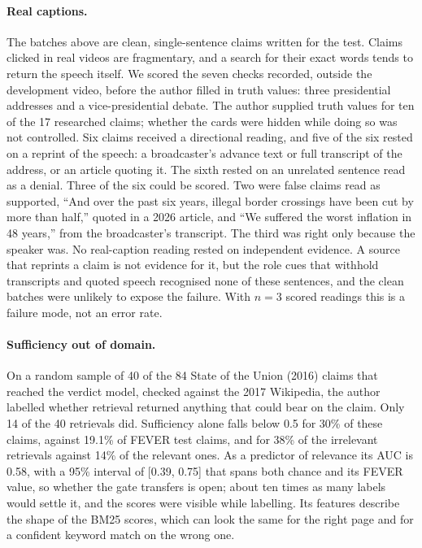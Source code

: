 \documentclass[11pt]{article}
\begin{document}
\paragraph{Real captions.} The batches above are clean, single-sentence claims written for the test.
Claims clicked in real videos are fragmentary, and a search for their exact words tends to return the
speech itself. We scored the seven checks recorded, outside the development video, before the author
filled in truth values: three presidential addresses and a vice-presidential debate. The author supplied
truth values for ten of the 17 researched claims; whether the cards were hidden while doing so was not
controlled. Six claims received a directional reading, and five of the six rested on a reprint of the
speech: a broadcaster's advance text or full transcript of the address, or an article quoting it. The
sixth rested on an unrelated sentence read as a denial. Three of the six could be scored. Two were false
claims read as supported, ``And over the past six years, illegal border crossings have been cut by more
than half,'' quoted in a 2026 article, and ``We suffered the worst inflation in 48 years,'' from the
broadcaster's transcript. The third was right only because the speaker was. No real-caption reading
rested on independent evidence. A source that reprints a claim is not evidence for it, but the role cues
that withhold transcripts and quoted speech recognised none of these sentences, and the clean batches were
unlikely to expose the failure. With $n = 3$ scored readings this is a failure mode, not an error rate.

\paragraph{Sufficiency out of domain.} On a random sample of 40 of the 84 State of the Union (2016) claims
that reached the verdict model, checked against the 2017 Wikipedia, the author labelled whether retrieval
returned anything that could bear on the claim. Only 14 of the 40 retrievals did. Sufficiency alone falls
below 0.5 for 30\% of these claims, against 19.1\% of FEVER test claims, and for 38\% of the irrelevant
retrievals against 14\% of the relevant ones. As a predictor of relevance its AUC is 0.58, with a 95\%
interval of [0.39, 0.75] that spans both chance and its FEVER value, so whether the gate transfers is
open; about ten times as many labels would settle it, and the scores were visible while labelling. Its
features describe the shape of the BM25 scores, which can look the same for the right page and for a
confident keyword match on the wrong one.
\end{document}
